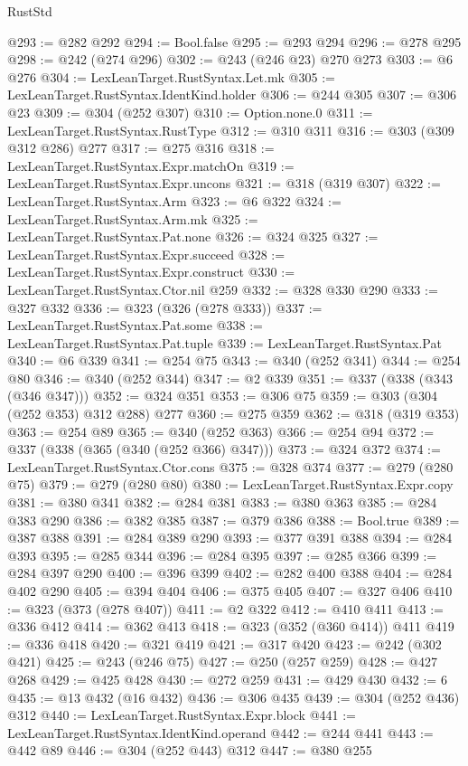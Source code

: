 \begin{lexlean}{RustStd}
\begin{coremodule}
{\begin{coremodule}
{{{{{{{{@293 := @282 @292
@294 := Bool.false
@295 := @293 @294
@296 := @278 @295
@298 := @242 (@274 @296)
@302 := @243 (@246 @23) @270 @273
@303 := @6 @276
@304 := LexLeanTarget.RustSyntax.Let.mk
@305 := LexLeanTarget.RustSyntax.IdentKind.holder
@306 := @244 @305
@307 := @306 @23
@309 := @304 (@252 @307)
@310 := Option.none.{0}
@311 := LexLeanTarget.RustSyntax.RustType
@312 := @310 @311
@316 := @303 (@309 @312 @286) @277
@317 := @275 @316
@318 := LexLeanTarget.RustSyntax.Expr.matchOn
@319 := LexLeanTarget.RustSyntax.Expr.uncons
@321 := @318 (@319 @307)
@322 := LexLeanTarget.RustSyntax.Arm
@323 := @6 @322
@324 := LexLeanTarget.RustSyntax.Arm.mk
@325 := LexLeanTarget.RustSyntax.Pat.none
@326 := @324 @325
@327 := LexLeanTarget.RustSyntax.Expr.succeed
@328 := LexLeanTarget.RustSyntax.Expr.construct
@330 := LexLeanTarget.RustSyntax.Ctor.nil @259
@332 := @328 @330 @290
@333 := @327 @332
@336 := @323 (@326 (@278 @333))
@337 := LexLeanTarget.RustSyntax.Pat.some
@338 := LexLeanTarget.RustSyntax.Pat.tuple
@339 := LexLeanTarget.RustSyntax.Pat
@340 := @6 @339
@341 := @254 @75
@343 := @340 (@252 @341)
@344 := @254 @80
@346 := @340 (@252 @344)
@347 := @2 @339
@351 := @337 (@338 (@343 (@346 @347)))
@352 := @324 @351
@353 := @306 @75
@359 := @303 (@304 (@252 @353) @312 @288) @277
@360 := @275 @359
@362 := @318 (@319 @353)
@363 := @254 @89
@365 := @340 (@252 @363)
@366 := @254 @94
@372 := @337 (@338 (@365 (@340 (@252 @366) @347)))
@373 := @324 @372
@374 := LexLeanTarget.RustSyntax.Ctor.cons
@375 := @328 @374
@377 := @279 (@280 @75)
@379 := @279 (@280 @80)
@380 := LexLeanTarget.RustSyntax.Expr.copy
@381 := @380 @341
@382 := @284 @381
@383 := @380 @363
@385 := @284 @383 @290
@386 := @382 @385
@387 := @379 @386
@388 := Bool.true
@389 := @387 @388
@391 := @284 @389 @290
@393 := @377 @391 @388
@394 := @284 @393
@395 := @285 @344
@396 := @284 @395
@397 := @285 @366
@399 := @284 @397 @290
@400 := @396 @399
@402 := @282 @400 @388
@404 := @284 @402 @290
@405 := @394 @404
@406 := @375 @405
@407 := @327 @406
@410 := @323 (@373 (@278 @407))
@411 := @2 @322
@412 := @410 @411
@413 := @336 @412
@414 := @362 @413
@418 := @323 (@352 (@360 @414)) @411
@419 := @336 @418
@420 := @321 @419
@421 := @317 @420
@423 := @242 (@302 @421)
@425 := @243 (@246 @75)
@427 := @250 (@257 @259)
@428 := @427 @268
@429 := @425 @428
@430 := @272 @259
@431 := @429 @430
@432 := 6
@435 := @13 @432 (@16 @432)
@436 := @306 @435
@439 := @304 (@252 @436) @312
@440 := LexLeanTarget.RustSyntax.Expr.block
@441 := LexLeanTarget.RustSyntax.IdentKind.operand
@442 := @244 @441
@443 := @442 @89
@446 := @304 (@252 @443) @312
@447 := @380 @255
}}}}}}}}
\end{coremodule}}
\end{coremodule}
\end{lexlean}
